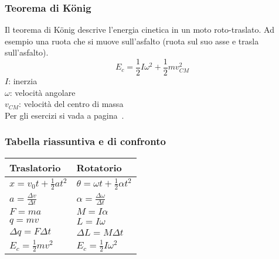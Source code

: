 \subsubsection{Teorema di König}
Il teorema di König descrive l'energia cinetica in un moto roto-traslato. Ad esempio una ruota che 
si muove sull'asfalto (ruota sul suo asse e trasla sull'asfalto).
\begin{equation*}
  E_c = \frac{1}{2} I\omega^2 + \frac{1}{2}mv_{CM}^2
\end{equation*}
$I$: inerzia\\
$\omega$: velocità angolare\\
$v_{CM}$: velocità del centro di massa\\[\baselineskip]
Per gli esercizi si vada a pagina~\pageref{ex:inerzia}.

\subsubsection{Tabella riassuntiva e di confronto}
\begin{center}
  \begin{tabular}{M{3cm} M{3cm}}
    \textbf{Traslatorio} & \textbf{Rotatorio}\\\hline
    $x=v_0t+\frac{1}{2}at^2$ & $\theta=\omega t+\frac{1}{2}\alpha t^2$\\\hline
    $a=\frac{\Delta v}{\Delta t}$ & $\alpha=\frac{\Delta\omega}{\Delta t}$\\\hline
    $F=ma$ & $M=I\alpha$\\\hline
    $q=mv$ & $L=I\omega$\\\hline
    $\Delta q=F\Delta t$ & $\Delta L = M\Delta t$\\\hline
    $E_c=\frac{1}{2}mv^2$ & $E_c=\frac{1}{2}I\omega^2$
  \end{tabular} 
\end{center}
